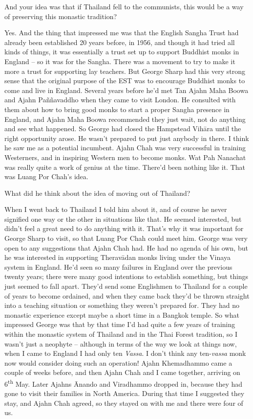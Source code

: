 \question{}
And your idea was that if Thailand fell to the communists, this
would be a way of preserving this monastic tradition? 

\answer{}
Yes. And the thing that impressed me was that the English
Sangha Trust had already been established 20 years before, in 1956, and
though it had tried all kinds of things, it was essentially a trust set
up to support Buddhist monks in England -- so it was for the Sangha.
There was a movement to try to make it more a trust for supporting lay
teachers. But George Sharp had this very strong sense that the original
purpose of the EST was to encourage Buddhist monks to come and live in
England. Several years before he'd met Tan Ajahn Maha Boowa and Ajahn
Paññavaddho when they came to visit London. He consulted with them about
how to bring good monks to start a proper Sangha presence in England, 
and Ajahn Maha Boowa recommended they just wait, not do anything and see
what happened. So George had closed the Hampstead Vihāra until the right
opportunity arose. He wasn't prepared to put just anybody in there. I
think he saw me as a potential incumbent. Ajahn Chah was very successful
in training Westerners, and in inspiring Western men to become monks. 
Wat Pah Nanachat was really quite a work of genius at the time. There'd
been nothing like it. That was Luang Por Chah's idea. 

\question{}
What did he think about the idea of moving out of Thailand?

\answer{}
When I went back to Thailand I told him about it, and of
course he never signified one way or the other in situations like that. 
He seemed interested, but didn't feel a great need to do anything with
it. That's why it was important for George Sharp to visit, so that Luang
Por Chah could meet him. George was very open to any suggestions that
Ajahn Chah had. He had no agenda of his own, but he was interested in
supporting Theravādan monks living under the Vinaya system in England. 
He'd seen so many failures in England over the previous twenty years; 
there were many good intentions to establish something, but things just
seemed to fall apart. They'd send some Englishmen to Thailand for a
couple of years to become ordained, and when they came back they'd be
thrown straight into a teaching situation or something they weren't
prepared for. They had no monastic experience except maybe a short time
in a Bangkok temple. So what impressed George was that by that time I'd
had quite a few years of training within the monastic system of Thailand
and in the Thai Forest tradition, so I wasn't just a neophyte --
although in terms of the way we look at things now, when I came to
England I had only ten \emph{Vassa}. I don't think any ten-\emph{vassa}
monk now would consider doing such an operation! Ajahn Khemadhammo came
a couple of weeks before, and then Ajahn Chah and I came together, 
arriving on 6\textsuperscript{th} May. Later Ajahns Ānando and Viradhammo dropped in, 
because they had gone to visit their families in North America. During
that time I suggested they stay, and Ajahn Chah agreed, so they stayed
on with me and there were four of us. 

